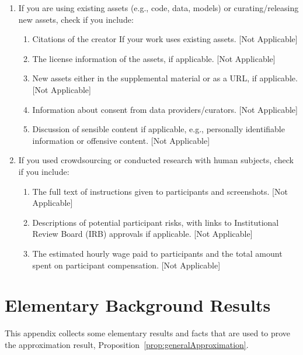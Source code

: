 \documentclass[twoside]{article}
\theoremstyle{definition}
\newcommand{\1}[1]{\scalebox{1.25}{$\mathds{1}$}\left[#1\right]}
\begin{document}
\begin{enumerate}
  \item If you are using existing assets (e.g., code, data, models) or curating/releasing new assets, check if you include:
  \begin{enumerate}
    \item Citations of the creator If your work uses existing assets. [Not Applicable]
    \item The license information of the assets, if applicable. [Not Applicable]
    \item New assets either in the supplemental material or as a URL, if applicable. [Not Applicable]
    \item Information about consent from data providers/curators. [Not Applicable]
    \item Discussion of sensible content if applicable, e.g., personally identifiable information or offensive content. [Not Applicable]
  \end{enumerate}

  \item If you used crowdsourcing or conducted research with human subjects, check if you include:
  \begin{enumerate}
    \item The full text of instructions given to participants and screenshots. [Not Applicable]
    \item Descriptions of potential participant risks, with links to Institutional Review Board (IRB) approvals if applicable. [Not Applicable]
    \item The estimated hourly wage paid to participants and the total amount spent on participant compensation. [Not Applicable]
  \end{enumerate}

\end{enumerate}
\fi


\clearpage




\appendix
\thispagestyle{empty}

\onecolumn


\section{Elementary Background Results}
This appendix collects some elementary results and facts that are used to prove the approximation result, Proposition~\ref{prop:generalApproximation}.
\end{document}
